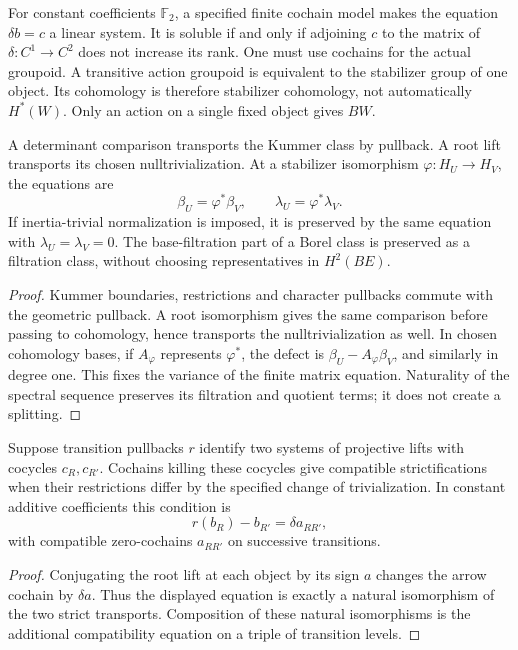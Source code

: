 For constant coefficients \(\mathbb F_2\), a specified finite
cochain model makes the equation \(\delta b=c\) a linear system.
It is soluble if and only if adjoining \(c\) to the matrix of
\(\delta:C^1\to C^2\) does not increase its rank.  One must use
cochains for the actual groupoid.  A transitive action groupoid is
equivalent to the stabilizer group of one object.  Its cohomology is
therefore stabilizer cohomology, not automatically \(H^*(W)\).
Only an action on a single fixed object gives \(BW\).

\begin{proposition}
\label{prop:weyl-alpha-red-preservation-criterion}
\label{prop:weyl-alpha-e-free-preservation-criterion}
\label{prop:weyl-finite-stabilizer-beta-preservation-criterion}
\label{prop:weyl-finite-stabilizer-lambda-zero-preservation-criterion}
A determinant comparison transports the Kummer class by pullback.
A root lift transports its chosen nulltrivialization.  At a
stabilizer isomorphism \(\varphi:H_U\to H_V\), the equations are
\[
 \beta_U=\varphi^*\beta_V,
 \qquad \lambda_U=\varphi^*\lambda_V.
\]
If inertia-trivial normalization is imposed, it is preserved by the
same equation with \(\lambda_U=\lambda_V=0\).  The base-filtration
part of a Borel class is preserved as a filtration class, without
choosing representatives in \(H^2(BE)\).
\end{proposition}
\begin{proof}
Kummer boundaries, restrictions and character pullbacks commute with
the geometric pullback.  A root isomorphism gives the same comparison
before passing to cohomology, hence transports the nulltrivialization
as well.  In chosen cohomology bases, if \(A_\varphi\) represents
\(\varphi^*\), the defect is \(\beta_U-A_\varphi\beta_V\), and
similarly in degree one.  This fixes the variance of the finite
matrix equation.  Naturality of the spectral sequence preserves its
filtration and quotient terms; it does not create a splitting.
\end{proof}

\begin{proposition}
\label{prop:orientation-cocycle-cochain-transition-compatibility}
Suppose transition pullbacks \(r\) identify two systems of
projective lifts with cocycles \(c_R,c_{R'}\).  Cochains killing
these cocycles give compatible strictifications when their
restrictions differ by the specified change of trivialization.  In
constant additive coefficients this condition is
\[
 r(b_R)-b_{R'}=\delta a_{RR'},
\]
with compatible zero-cochains \(a_{RR'}\) on successive transitions.
\end{proposition}
\begin{proof}
Conjugating the root lift at each object by its sign \(a\) changes
the arrow cochain by \(\delta a\).  Thus the displayed equation
is exactly a natural isomorphism of the two strict transports.
Composition of these natural isomorphisms is the additional
compatibility equation on a triple of transition levels.
\end{proof}

